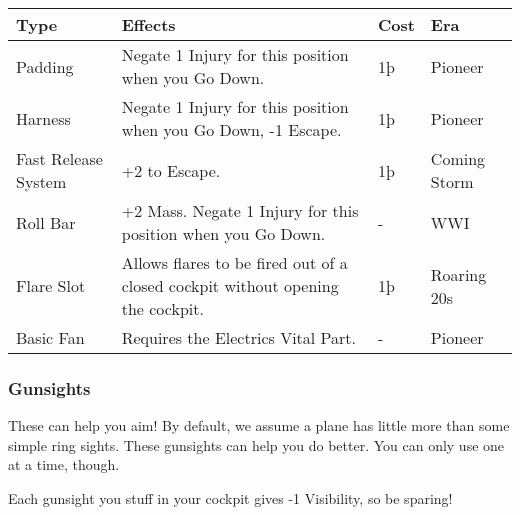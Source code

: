 \documentclass{article}
\begin{document}
\begin{tabular}{|l|l|l|l|}
    \hline
    Type                 & Effects                                                        & Cost        & Era          \\\hline
    Padding              & Negate 1 Injury for this position when you Go Down.            & 1þ          &
    Pioneer                                                                                                            \\\hline
    Harness              & Negate 1 Injury for this position when you Go Down, -1 Escape.
                         & 1þ                                                             & Pioneer                    \\\hline
    Fast Release System  & +2 to Escape.                                                  & 1þ          & Coming Storm \\\hline
    Roll Bar             & +2 Mass. Negate 1 Injury for this position when you Go Down.
                         & -                                                              & WWI                        \\\hline
    Flare Slot           & Allows flares to be fired out of a closed cockpit without
    opening the cockpit. & 1þ                                                             & Roaring 20s                \\\hline
    Basic Fan            & Requires the Electrics Vital Part.                             & -           & Pioneer      \\\hline
\end{tabular}

\subsubsection{Gunsights}
\label{_Gunsights}

These can help you aim! By default, we assume a plane has little more
than some simple ring sights. These gunsights can help you do better.
You can only use one at a time, though.

Each gunsight you stuff in your cockpit gives -1 Visibility, so
be sparing!
\end{document}
